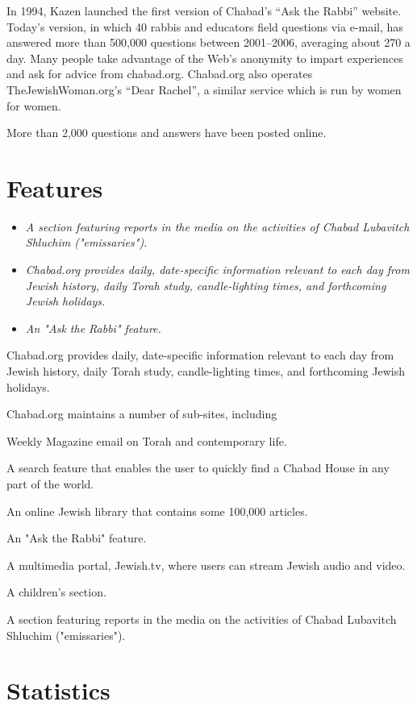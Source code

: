 In 1994, Kazen launched the first version of Chabad's ``Ask the Rabbi''
website. Today's version, in which 40 rabbis and educators field
questions via e-mail, has answered more than 500,000 questions between
2001--2006, averaging about 270 a day. Many people take advantage of the
Web's anonymity to impart experiences and ask for advice from
chabad.org. Chabad.org also operates TheJewishWoman.org's ``Dear
Rachel'', a similar service which is run by women for women.

More than 2,000 questions and answers have been posted online.

\section{Features}\label{features}

\begin{itemize}
\item
  \emph{A section featuring reports in the media on the activities of
  Chabad Lubavitch Shluchim ("emissaries").}
\item
  \emph{Chabad.org provides daily, date-specific information relevant to
  each day from Jewish history, daily Torah study, candle-lighting
  times, and forthcoming Jewish holidays.}
\item
  \emph{An "Ask the Rabbi" feature.}
\end{itemize}

Chabad.org provides daily, date-specific information relevant to each
day from Jewish history, daily Torah study, candle-lighting times, and
forthcoming Jewish holidays.

Chabad.org maintains a number of sub-sites, including

Weekly Magazine email on Torah and contemporary life.

A search feature that enables the user to quickly find a Chabad House in
any part of the world.

An online Jewish library that contains some 100,000 articles.

An "Ask the Rabbi" feature.

A multimedia portal, Jewish.tv, where users can stream Jewish audio and
video.

A children's section.

A section featuring reports in the media on the activities of Chabad
Lubavitch Shluchim ("emissaries").

\section{Statistics}\label{statistics}

